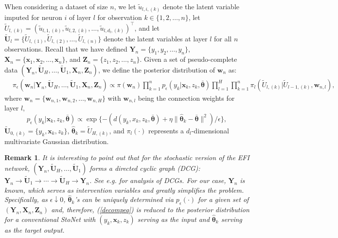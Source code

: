 \documentclass[11pt]{article}
\newcommand{\bX}{{\boldsymbol X}}
\newcommand{\bY}{{\boldsymbol Y}}
\newcommand{\bx}{{\boldsymbol x}}
\newcommand{\bZ}{{\boldsymbol Z}}
\newcommand{\bw}{{\boldsymbol w}}
\newcommand{\bU}{{\boldsymbol U}}
\newcommand{\btheta}{{\boldsymbol \theta}}
\newtheorem{remark}{Remark}
\begin{document}
When considering a dataset of size $n$,   
we let $\tilde{u}_{l,i,(k)}$ denote the latent variable imputed for neuron $i$ 
of layer $l$ for observation $k \in \{1,2,\ldots,n\}$, 
let $\tilde{U}_{l,(k)}=(\tilde{u}_{l,1,(k)}, \tilde{u}_{l,2,(k)},\ldots, \tilde{u}_{l,d_l,(k)})^{\top}$, and 
let $\tilde{\bU}_l=\{\tilde{U}_{l,(1)}, \tilde{U}_{l,(2)},\ldots, \tilde{U}_{l,(n)} \}$ denote the latent variables at layer $l$ for all $n$ observations. 
Recall that we have defined $\bY_n=\{y_1,y_2,\ldots,y_n\}$, 
$\bX_n=\{\bx_1,\bx_2,\ldots,\bx_n\}$, and $\bZ_n=\{z_1,z_2,\ldots,z_n\}$.   
Given a set of pseudo-complete data  $(\bY_n,\tilde{\bU}_H,\ldots, \tilde{\bU}_1,\bX_n, \bZ_n)$,  we define the posterior distribution of $\bw_n$ as:  
\begin{equation} \label{decompeq}
\begin{split} 
 & \pi_{\epsilon}(\bw_n|\bY_n,\tilde{\bU}_H,\ldots, \tilde{\bU}_1,\bX_n, \bZ_n)
 \propto \pi(\bw_n) \prod_{k=1}^n p_{\epsilon}(y_k|\bx_k,z_k,\bar{\btheta})  
  \prod_{l=1}^H \prod_{k=1}^n \pi_l(\tilde{U}_{l,(k)}| \tilde{U}_{l-1,(k)},\bw_{n,l}),   
 \end{split} 
\end{equation}
where $\bw_n=\{\bw_{n,1},\bw_{n,2},\ldots,\bw_{n,H}\}$ with 
$\bw_{n,l}$ being the connection weights for layer $l$,
\[
p_{\epsilon} (y_k|\bx_k,z_k,\bar{\btheta}) \propto \exp\{-(d(y_k,x_k, z_k, \bar{\btheta})  +\eta \|\hat{\btheta}_k-\bar{\btheta} \|^2)/\epsilon \},
\]
$\tilde{\bU}_{0,(k)}=\{y_k,\bx_k,z_k\}$,  
$\hat{\btheta}_k=\tilde{U}_{H,(k)}$, and  $\pi_l(\cdot)$ 
represents a $d_l$-dimensional multivariate Gaussian distribution. 

\begin{remark} \label{cyclicgraph} It is interesting to point out that for the stochastic version of the EFI network, $(\bY_n,\tilde{\bU}_H,\ldots,\tilde{\bU}_1)$ forms a directed cyclic graph (DCG): $\bY_n\to \tilde{\bU}_1 \to \cdots\to \tilde{\bU}_H \to \bY_n$. See e.g. \cite{Sethuraman2023NODAGSFlowNC} for analysis of DCGs. For our case, $\bY_n$ is known, 
 which serves as intervention variables and greatly simplifies the problem. 
 Specifically,  as $\epsilon \downarrow 0$,  $\hat{\btheta}_k$'s can be uniquely determined via $p_{\epsilon}(\cdot)$ for a given set of $(\bY_n,\bX_n,\bZ_n)$ and, therefore, 
 (\ref{decompeq}) is reduced to the posterior distribution for a conventional StoNet with 
 $(y_k,\bx_k,z_k)$ serving as the input and $\hat{\btheta}_k$ serving as the target output. 
\end{remark}
\end{document}
